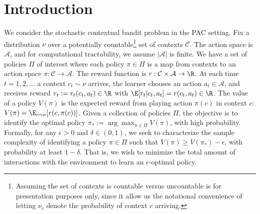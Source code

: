 \documentclass{article}
\newcommand{\mc}[1]{\mathcal{#1}}
\newcommand{\kevin}[1]{\textcolor{red}{KGJ:#1}}
\newcommand{\houssam}[1]{\textcolor{magenta}{HN: #1}}
\newcommand{\1}{\mathbf{1}}
\renewcommand{\v}{r} %
\begin{document}
\section{Introduction}


We consider the stochastic contextual bandit problem in the PAC setting.
Fix a distribution $\nu$ over a potentially countable\footnote{Assuming the set of contexts is countable versus uncountable is for presentation purposes only, since it allow us the notational convenience of letting $\nu_c$ denote the probability of context $c$ arriving.} set of contexts $\mc{C}$.
The action space is $\mc{A}$, and for computational tractability, we assume $|\mc{A}|$ is finite.
We have a set of policies $\Pi$ of interest where each policy $\pi \in \Pi$ is a map from contexts to an action space $\pi: \mc{C} \rightarrow \mc{A}$.
The reward function is $\v: \mc{C} \times \mc{A} \rightarrow \R$.
At each time $t=1,2,\dots$ a context $c_t \sim \nu$ arrives, the learner chooses an action $a_t \in \mc{A}$, and receives reward $r_t:=r_t(c_t,a_t)\in \R$ with $\E[r_t | c_t, a_t] = \v(c_t,a_t) \in \R$. 
The value of a policy $V(\pi)$ is the expected reward from playing action $\pi(c)$ in context $c$: $V(\pi) = \E_{c \sim \nu}[ \v(c, \pi(c)) ]$.
Given a collection of policies $\Pi$, the objective is to identify the optimal policy $\pi_{\ast} := \arg\max_{\pi \in \Pi} V(\pi)$, with high probability. 
Formally, for any $\epsilon > 0$ and $\delta \in (0,1)$, we seek to characterize the sample complexity of identifying a policy $\pi \in \Pi$ such that $V(\pi) \geq V(\pi_{\ast}) - \epsilon$, with probability at least $1-\delta$. 
That is, we wish to minimize the total amount of interactions with the environment to learn an $\epsilon$-optimal policy.
\end{document}
